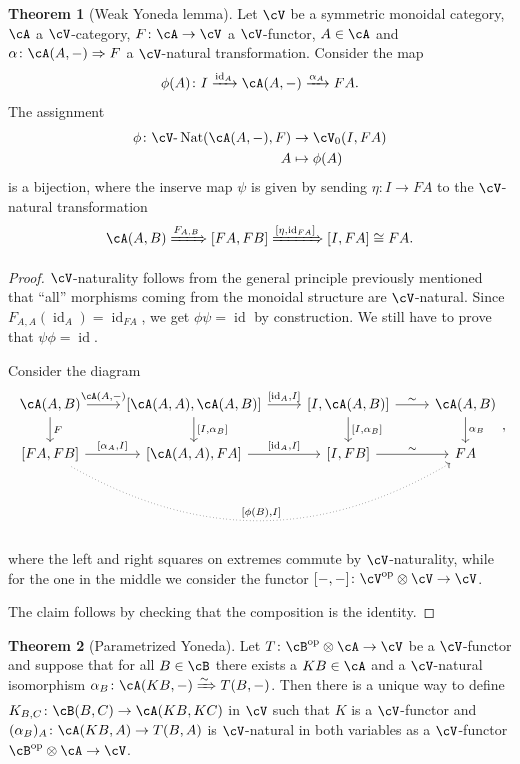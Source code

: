\documentclass[a4paper,11pt,oneside,openany]{scrbook}
\DeclareMathOperator{\op}{\text{op}}
\DeclareMathOperator{\id}{id}
\DeclareMathOperator{\Nat}{Nat}
\theoremstyle{definition}
\newtheorem{thm}{Theorem}[section] %
\theoremstyle{definition}
\begin{document}
\begin{thm}[Weak Yoneda lemma]
    Let $\cV$ be a symmetric monoidal category, $\cA$ a $\cV$-category, $F\colon\cA\rightarrow\cV$ a $\cV$-functor, $A\in\cA$ and $\alpha\colon\cA(A,-)\Rightarrow F$ a $\cV$-natural transformation. Consider the map$$\phi(A)\colon I\xrightarrow{\id_A}\cA(A,-)\xrightarrow{\alpha_A}FA.$$
    The assignment
    \begin{align*}
        \phi\colon\cV\text{-}\Nat(\cA(A,-),F) &\rightarrow\cV_0(I,FA) \\
        A &\mapsto\phi(A)
    \end{align*}
    is a bijection, where the inserve map $\psi$ is given by sending $\eta\colon I\rightarrow FA$ to the $\cV$-natural transformation
    $$\cA(A,B)\xRightarrow{F_{A,B}}[FA,FB]\xRightarrow{[\eta,\id_{FA}]}[I,FA]\cong FA.$$
\end{thm}

\begin{proof}
    $\cV$-naturality follows from the general principle previously mentioned that ``all'' morphisms coming from the monoidal structure are $\cV$-natural. Since $F_{A,A}(\id_A)=\id_{FA}$, we get $\phi\psi=\id$ by construction. We still have to prove that $\psi\phi=\id$.
    
    Consider the diagram
    \[
    \begin{tikzcd}
        \cA(A,B)\ar[r, "{\cA(A,-)}"]\ar[d, "F"]
        & {[\cA(A,A),\cA(A,B)]}\ar[r, "{[\id_A,I]}"]\ar[d, "{[I,\alpha_B]}"]
        & {[I,\cA(A,B)]}\ar[r, "\sim"]\ar[d, "{[I,\alpha_B]}"]
        & \cA(A,B)\ar[d, "\alpha_B"] \\
        {[FA,FB]}\ar[r, "{[\alpha_A,I]}"]\ar[rrr, bend right, dotted, "{[\phi(B),I]}"]
        & {[\cA(A,A),FA]}\ar[r, "{[\id_A,I]}"]
        & {[I,FB]}\ar[r, "\sim"]
        & FA
    \end{tikzcd}
    ,\]
    where the left and right squares on extremes commute by $\cV$-naturality, while for the one in the middle we consider the functor $[-,-]\colon\cV^{\op}\otimes\cV\rightarrow\cV$.
    
    The claim follows by checking that the composition is the identity.
\end{proof}

\begin{thm}[Parametrized Yoneda]
    Let $T\colon\cB^{\op}\otimes\cA\rightarrow\cV$ be a $\cV$-functor and suppose that for all $B\in\cB$ there exists a $KB\in\cA$ and a $\cV$-natural isomorphism $\alpha_B\colon\cA(KB,-)\xRightarrow{\sim} T(B,-)$. Then there is a unique way to define $K_{B,C}\colon\cB(B,C)\rightarrow\cA(KB,KC)$ in $\cV$ such that $K$ is a $\cV$-functor and $(\alpha_B)_A\colon\cA(KB,A)\rightarrow T(B,A)$ is $\cV$-natural in both variables as a $\cV$-functor $\cB^{\op}\otimes\cA\rightarrow\cV$.
\end{thm}
\end{document}
